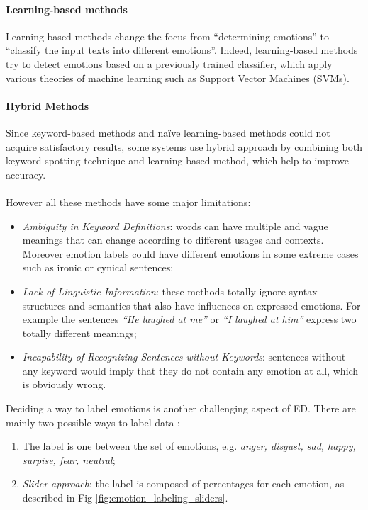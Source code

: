 \paragraph{Learning-based methods}
Learning-based methods change the focus from ``determining emotions'' to ``classify the input texts into different emotions''. Indeed, learning-based methods try to detect emotions based on a previously trained classifier, which apply various theories of machine learning such as Support Vector Machines (SVMs).

\paragraph{Hybrid Methods}
Since keyword-based methods and na\"{i}ve learning-based methods could not acquire satisfactory results, some systems use hybrid approach by combining both keyword spotting technique and learning based method, which help to improve accuracy. \\
\\

However all these methods have some major limitations:
\begin{itemize}
\item \textit{Ambiguity in Keyword Definitions}: words can have multiple and vague meanings that can change according to different usages and contexts. Moreover emotion labels could have different emotions in some extreme cases such as ironic or cynical sentences; 
\item \textit{Lack of Linguistic Information}: these methods totally ignore syntax structures and semantics that also have influences on expressed emotions. For example the sentences \textit{``He laughed at me''} or \textit{``I laughed at him''} express two totally different meanings;
\item \textit{Incapability of Recognizing Sentences without Keywords}: sentences without any keyword would imply that they do not contain any emotion at all, which is obviously wrong. 
\end{itemize}

Deciding a way to label emotions is another challenging aspect of ED. There are mainly two possible ways to label data \cite{microsoft}:
\begin{enumerate}
\item The label is one between the set of emotions, e.g. \textit{anger, disgust, sad, happy, surpise, fear, neutral};
\item \textit{Slider approach}: the label is composed of percentages for each emotion, as described in Fig \ref{fig:emotion_labeling_sliders}.
\end{enumerate}

